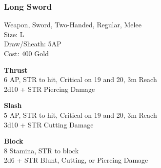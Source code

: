 \subsubsection{Long Sword}\label{weapon:longSword}
Weapon, Sword, Two-Handed, Regular, Melee\\
Size: L\\
Draw/Sheath: 5AP\\
Cost: 400 Gold

\textbf{Thrust}\\
6 AP, STR to hit, Critical on 19 and 20, 3m Reach\\
2d10 + \texttimes STR Piercing Damage

\textbf{Slash}\\
5 AP, STR to hit, Critical on 19 and 20, 3m Reach\\
3d10 + \texttimes STR Cutting Damage

\textbf{Block}\\
8 Stamina, STR to block\\
2d6 + \texttimes STR Blunt, Cutting, or Piercing Damage